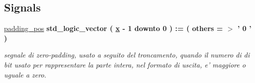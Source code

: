 \subsection*{Signals}
 \begin{DoxyCompactItemize}
\item 
\hyperlink{group___truncation_gac257856843ad01f95857ccecfea5e47e}{padding\+\_\+pos} {\bfseries \textcolor{vhdlchar}{std\+\_\+logic\+\_\+vector}\textcolor{vhdlchar}{ }\textcolor{vhdlchar}{(}\textcolor{vhdlchar}{ }\textcolor{vhdlchar}{ }\textcolor{vhdlchar}{ }\textcolor{vhdlchar}{ }{\bfseries \hyperlink{group___truncation_ga63701d8af27da7452a7588efcff357bc}{x}} \textcolor{vhdlchar}{-\/}\textcolor{vhdlchar}{ } \textcolor{vhdldigit}{1} \textcolor{vhdlchar}{ }\textcolor{vhdlchar}{downto}\textcolor{vhdlchar}{ }\textcolor{vhdlchar}{ } \textcolor{vhdldigit}{0} \textcolor{vhdlchar}{ }\textcolor{vhdlchar}{)}\textcolor{vhdlchar}{ }\textcolor{vhdlchar}{ }\textcolor{vhdlchar}{ }\textcolor{vhdlchar}{\+:}\textcolor{vhdlchar}{=}\textcolor{vhdlchar}{ }\textcolor{vhdlchar}{(}\textcolor{vhdlchar}{ }\textcolor{vhdlchar}{ }\textcolor{vhdlchar}{others}\textcolor{vhdlchar}{ }\textcolor{vhdlchar}{ }\textcolor{vhdlchar}{=}\textcolor{vhdlchar}{ }\textcolor{vhdlchar}{$>$}\textcolor{vhdlchar}{ }\textcolor{vhdlchar}{'}\textcolor{vhdlchar}{ } \textcolor{vhdldigit}{0} \textcolor{vhdlchar}{ }\textcolor{vhdlchar}{'}\textcolor{vhdlchar}{ }\textcolor{vhdlchar}{)}\textcolor{vhdlchar}{ }} 
\begin{DoxyCompactList}\small\item\em segnale di zero-\/padding, usato a seguito del troncamento, quando il numero di di bit usato per rappresentare la parte intera, nel formato di uscita, e' maggiore o uguale a zero. \end{DoxyCompactList}\item 

\end{DoxyCompactItemize}
